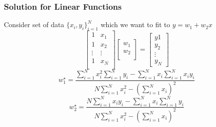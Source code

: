     \subsubsection{Solution for Linear Functions}
        Consider set of data $\{x_i, y_i\}_{i = 1}^N$ which we want to fit to $y = w_1 + w_2 x$
        \begin{equation*}
        \begin{bmatrix}
            1 & x_1\\
            1 & x_2\\
            \vdots & \vdots\\
            1 & x_N\\
        \end{bmatrix}
        \begin{bmatrix}
            w_1\\
            w_2\\
        \end{bmatrix}
        = 
        \begin{bmatrix}
            y1\\
            y_2\\
            \vdots\\
            y_N
        \end{bmatrix}
    \end{equation*}
    \begin{equation*}
        w_1^\star = \frac{\sum_{i=1}^N x_i^2\sum_{i=1}^N y_i-\sum_{i=1}^N x_i\sum_{i=1}^N x_iy_i}{N\sum_{i=1}^N x_i^2-\left(\sum_{i=1}^N x_i\right)^2}
    \end{equation*}
    \begin{equation*}
        w_2^\star = \frac{N\sum_{i=1}^N x_iy_i-\sum_{i=1}^N x_i\sum_{i=1}^N y_i}{N\sum_{i=1}^N x_i^2-\left(\sum_{i=1}^N x_i\right)^2}
    \end{equation*}

